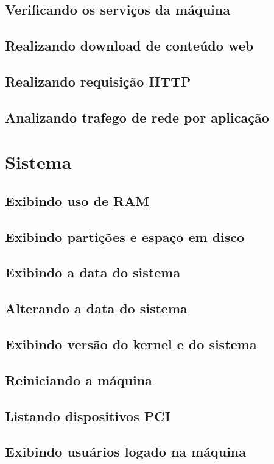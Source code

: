\documentclass[a4paper,8pt]{extarticle}
\begin{document}
\begin{multicols}{2}
\subsection{Verificando os serviços da máquina}
\subsection{Realizando download de conteúdo web}
\subsection{Realizando requisição HTTP}
\subsection{Analizando trafego de rede por aplicação}

\section{Sistema}
\subsection{Exibindo uso de RAM}
\subsection{Exibindo partições e espaço em disco}
\subsection{Exibindo a data do sistema}
\subsection{Alterando a data do sistema}
\subsection{Exibindo versão do kernel e do sistema}
\subsection{Reiniciando a máquina}
\subsection{Listando dispositivos PCI}
\subsection{Exibindo usuários logado na máquina}

\end{multicols}
\end{document}
